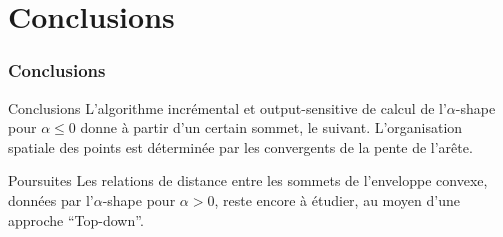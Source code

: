 \section{Conclusions}

\begin{frame}
\frametitle{Conclusions}
\begin{block}{Conclusions}
  L'algorithme incrémental et output-sensitive de calcul de l'$\alpha$-shape pour $\alpha \leq 0$ donne à partir d'un certain sommet, le suivant. 
  L'organisation spatiale des points est déterminée par les convergents de la pente de l'arête.
\end{block}

\begin{block}{Poursuites}
  Les relations de distance entre les sommets de l'enveloppe convexe, données par l'$\alpha$-shape pour $\alpha > 0$, reste encore à étudier, au moyen d'une approche ``Top-down''.
  
\end{block}

\end{frame}

